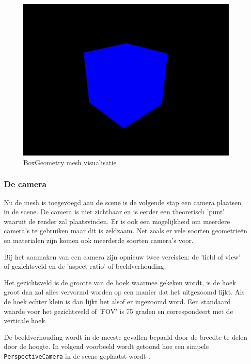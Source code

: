 \begin{figure}
\centering
\includegraphics[width=1\linewidth]{graphics/boxGeometry}
\caption[BoxGeometry mesh visualisatie]{BoxGeometry mesh visualisatie}
\label{fig:boxGeometry}
\end{figure}

\newpage
\subsubsection{De camera}

Nu de mesh is toegevoegd aan de scene is de volgende stap een camera plaatsen in de scene. De camera is niet zichtbaar en is eerder een theoretisch 'punt' waaruit de render zal plaatsvinden. Er is ook een mogelijkheid om meerdere camera's te gebruiken maar dit is zeldzaam. Net zoals er vele soorten geometrieën en materialen zijn komen ook meerderde soorten camera's voor.

Bij het aanmaken van een camera zijn opnieuw twee vereisten: de 'field of view' of gezichtsveld en de 'aspect ratio' of beeldverhouding. 

Het gezichtsveld is de grootte van de hoek waarmee gekeken wordt, is de hoek groot dan zal alles vervormd worden op een manier dat het uitgezoomd lijkt. Als de hoek echter klein is dan lijkt het alsof er ingezoomd word. Een standaard waarde voor het gezichtsveld of 'FOV' is 75 graden en correspondeert met de verticale hoek.

De beeldverhouding wordt in de meeste gevallen bepaald door de breedte te delen door de hoogte. In volgend voorbeeld wordt getoond hoe een simpele \texttt{PerspectiveCamera} in de scene geplaatst wordt \autocite{Simon2023}.

